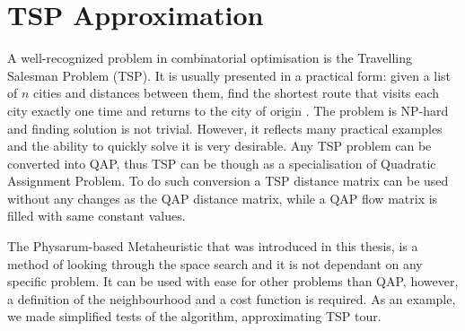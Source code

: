 \documentclass[english,a4paper,twoside]{ppfcmthesis}
\begin{document}
\begin{table}
  \bigskip\bigskip
\end{table}

\begin{table}
  \bigskip\bigskip
  \bigskip\bigskip
\end{table}

\begin{table}
\end{table}

\begin{table}
  \bigskip\bigskip
  \bigskip\bigskip
\end{table}

\begin{table}
\end{table}

\chapter{TSP Approximation}
\label{chapter:tsp}

A well-recognized problem in combinatorial optimisation is the Travelling Salesman Problem (TSP). It is usually presented in a practical form: given a list of $n$ cities and distances between them, find the shortest route that visits each city exactly one time and returns to the city of origin \cite{kruskal1956shortest}. The problem is NP-hard and finding solution is not trivial. However, it reflects many practical examples and the ability to quickly solve it is very desirable. Any TSP problem can be converted into QAP, thus TSP can be though as a specialisation of Quadratic Assignment Problem. To do such conversion a TSP distance matrix can be used without any changes as the QAP distance matrix, while a QAP flow matrix is filled with same constant values.

The Physarum-based Metaheuristic that was introduced in this thesis, is a method of looking through the space search and it is not dependant on any specific problem. It can be used with ease for other problems than QAP, however, a definition of the neighbourhood and a cost function is required. As an example, we made simplified tests of the algorithm, approximating TSP tour.
\end{document}
